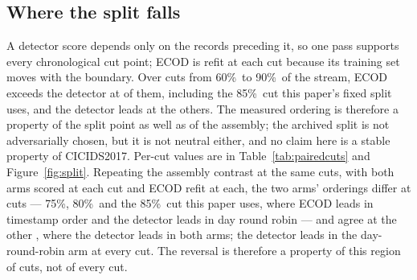 \documentclass[manuscript,screen,nonacm]{acmart}
\begin{document}
\subsection{Where the split falls}
A detector score depends only on the records preceding it, so one pass supports
every chronological cut point; ECOD is refit at each cut because its training
set moves with the boundary. Over \RevSplitCuts{} cuts from 60\%\ to 90\%\ of
the stream, ECOD exceeds the detector at \RevSplitEcodWins{} of them, including
the 85\%\ cut this paper's fixed split uses, and the detector leads at the
others. The measured ordering is therefore a property of the split point as well
as of the assembly; the archived split is not adversarially chosen, but it is
not neutral either, and no claim here is a stable property of CICIDS2017.
Per-cut values are in Table~\ref{tab:pairedcuts} and Figure~\ref{fig:split}.
Repeating the assembly contrast at the same \RefPairedCuts{} cuts, with both
arms scored at each cut and ECOD refit at each, the two arms' orderings differ
at \RefPairedCutsOrderingsDiffer{} cuts --- 75\%, 80\%\ and the 85\%\ cut this
paper uses, where ECOD leads in timestamp order and the detector leads in day
round robin --- and agree at the other \RefPairedCutsOrderingsAgree, where the
detector leads in both arms; the detector leads in the day-round-robin arm at
every cut. The reversal is therefore a property of this region of cuts, not of
every cut.
\end{document}
